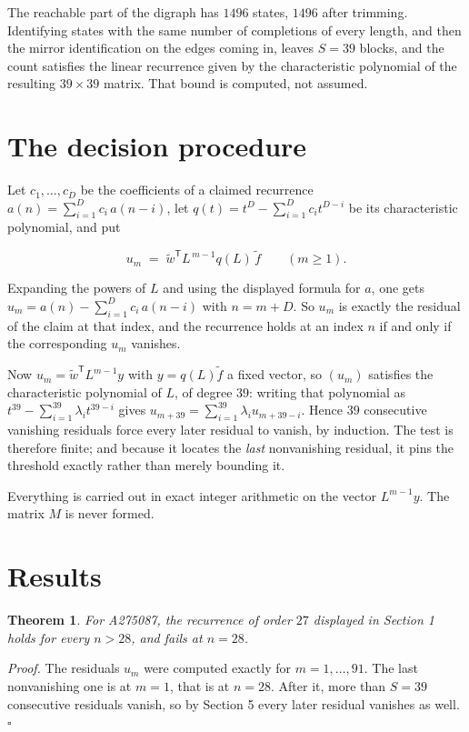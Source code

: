 \documentclass[11pt]{article}
\newtheorem{theorem}{Theorem}
\theoremstyle{definition}
\begin{document}
The reachable part of the digraph has $1496$ states, $1496$ after trimming. Identifying states with the same number of completions of every length, and then the mirror identification on the edges coming in, leaves $S = 39$ blocks, and the count satisfies the linear recurrence given by the characteristic polynomial of the resulting $39\times39$ matrix. That bound is computed, not assumed.

\section{The decision procedure}

Let $c_1,\dots,c_D$ be the coefficients of a claimed recurrence $a(n) = \sum_{i=1}^{D} c_i\,a(n-i)$, let $q(t) = t^{D} - \sum_{i=1}^{D} c_i t^{D-i}$ be its characteristic polynomial, and put

\[u_m \;=\; \tilde w^{\mathsf T} L^{\,m-1} q(L)\,\tilde f \qquad (m \ge 1).\]

Expanding the powers of $L$ and using the displayed formula for $a$, one gets $u_m = a(n) - \sum_{i=1}^{D} c_i\,a(n-i)$ with $n = m + D$. So $u_m$ is exactly the residual of the claim at that index, and the recurrence holds at an index $n$ if and only if the corresponding $u_m$ vanishes.

Now $u_m = \tilde w^{\mathsf T} L^{m-1} y$ with $y = q(L)\tilde f$ a fixed vector, so $(u_m)$ satisfies the characteristic polynomial of $L$, of degree $39$: writing that polynomial as $t^{39} - \sum_{i=1}^{39} \lambda_i t^{39-i}$ gives $u_{m+39} = \sum_{i=1}^{39} \lambda_i u_{m+39-i}$. Hence $39$ consecutive vanishing residuals force every later residual to vanish, by induction. The test is therefore finite; and because it locates the {\itshape last} nonvanishing residual, it pins the threshold exactly rather than merely bounding it.

Everything is carried out in exact integer arithmetic on the vector $L^{m-1}y$. The matrix $M$ is never formed.

\section{Results}

\begin{theorem} For A275087, the recurrence of order $27$ displayed in Section 1 holds for every $n > 28$, and fails at $n = 28$.\end{theorem}

{\itshape Proof.} The residuals $u_m$ were computed exactly for $m = 1,\dots,91$. The last nonvanishing one is at $m = 1$, that is at $n = 28$. After it, more than $S = 39$ consecutive residuals vanish, so by Section 5 every later residual vanishes as well. $\square$
\end{document}
